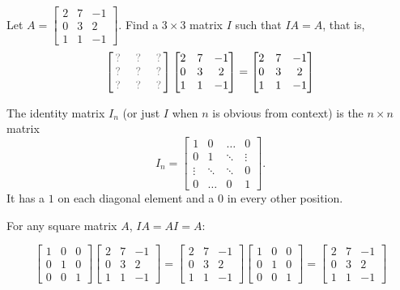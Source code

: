 \begin{applicationActivities}
\begin{activity}{5}
Let $A=\begin{bmatrix} 2 & 7 & -1 \\ 0 & 3 & 2 \\ 1 & 1 & -1 \end{bmatrix}$.  Find a $3 \times 3$ matrix $I$ such that $IA=A$, that is,
\[
  \begin{bmatrix} \unknown & \unknown & \unknown \\ \unknown & \unknown & \unknown \\ \unknown & \unknown & \unknown \end{bmatrix}
  \begin{bmatrix} 2 & 7 & -1 \\ 0 & 3 & 2 \\ 1 & 1 & -1 \end{bmatrix}
=
  \begin{bmatrix} 2 & 7 & -1 \\ 0 & 3 & 2 \\ 1 & 1 & -1 \end{bmatrix}
\]
\end{activity}

\begin{definition}
The identity matrix $I_n$ (or just $I$ when $n$ is obvious from context) is  the $n \times n$ matrix $$I_n = \begin{bmatrix} 1 & 0  & \hdots & 0 \\ 0 & 1 & \ddots & \vdots  \\ \vdots & \ddots & \ddots & 0 \\ 0 & \hdots & 0 & 1 \end{bmatrix}.$$
It has a $1$ on each diagonal element and a $0$ in every other position.
\end{definition}

\begin{fact}
  For any square matrix \(A\), \(IA=AI=A\):

  \[
    \begin{bmatrix} 1 & 0 & 0 \\ 0 & 1 & 0 \\ 0 & 0 & 1 \end{bmatrix}
    \begin{bmatrix} 2 & 7 & -1 \\ 0 & 3 & 2 \\ 1 & 1 & -1 \end{bmatrix}
  =
    \begin{bmatrix} 2 & 7 & -1 \\ 0 & 3 & 2 \\ 1 & 1 & -1 \end{bmatrix}
      \begin{bmatrix} 1 & 0 & 0 \\ 0 & 1 & 0 \\ 0 & 0 & 1 \end{bmatrix}
  =
    \begin{bmatrix} 2 & 7 & -1 \\ 0 & 3 & 2 \\ 1 & 1 & -1 \end{bmatrix}
  \]
\end{fact}


\end{applicationActivities}
